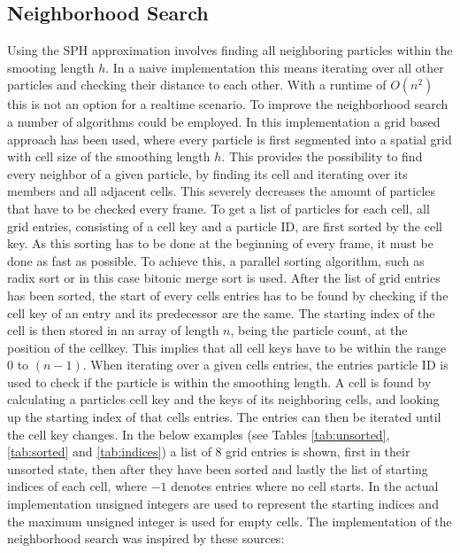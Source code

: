 \documentclass[intern]{cgMA}
\begin{document}
    \subsection{Neighborhood Search}
    Using the SPH approximation involves finding all neighboring particles within the smooting length $h$. In a naive implementation this means iterating over all other particles and checking their distance to each other. With a runtime of $O(n^2)$ this is not an option for a realtime scenario. To improve the neighborhood search a number of algorithms could be employed. 
    In this implementation a grid based approach has been used, where every particle is first segmented into a spatial grid with cell size of the smoothing length $h$. This provides the possibility to find every neighbor of a given particle, by finding its cell and iterating over its members and all adjacent cells. This severely decreases the amount of particles that have to be checked every frame. 
    To get a list of particles for each cell, all grid entries, consisting of a cell key and a particle ID, are first sorted by the cell key. As this sorting has to be done at the beginning of every frame, it must be done as fast as possible. To achieve this, a parallel sorting algorithm, such as radix sort or in this case bitonic merge sort is used. After the list of grid entries has been sorted, the start of every cells entries has to be found by checking if the cell key of an entry and its predecessor are the same. The starting index of the cell is then stored in an array of length $n$, being the particle count, at the position of the cellkey. This implies that all cell keys have to be within the range $0$ to $(n - 1)$. 
    When iterating over a given cells entries, the entries particle ID is used to check if the particle is within the smoothing length. A cell is found by calculating a particles cell key and the keys of its neighboring cells, and looking up the starting index of that cells entries. The entries can then be iterated until the cell key changes. In the below examples (see Tables \ref{tab:unsorted}, \ref{tab:sorted} and \ref{tab:indices}) a list of 8 grid entries is shown, first in their unsorted state, then after they have been sorted and lastly the list of starting indices of each cell, where $-1$ denotes entries where no cell starts. In the actual implementation unsigned integers are used to represent the starting indices and the maximum unsigned integer is used for empty cells. The implementation of the neighborhood search was inspired by these sources: \cite{psuc} \cite{seblague} \cite{bitonic}
    
\end{document}
